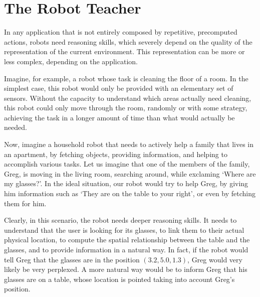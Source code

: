 \part{The Robot Teacher} %

\label{part:robot_teacher} %



In any application that is not entirely composed by repetitive, precomputed actions, robots need reasoning skills, which severely depend on the quality of the representation of the current environment. This representation can be more or less complex, depending on the application. 

Imagine, for example, a robot whose task is cleaning the floor of a room. In the simplest case, this robot would only be provided with an elementary set of sensors. Without the capacity to understand which areas actually need cleaning, this robot could only move through the room, randomly or with some strategy, achieving the task in a longer amount of time than what would actually be needed. 


Now, imagine a household robot that needs to actively help a family that lives in an apartment, by fetching objects, providing information, and helping to accomplish various tasks. Let us imagine that one of the members of the family, Greg, is moving in the living room, searching around, while exclaming `Where are my glasses?'. In the ideal situation, our robot would try to help Greg, by giving him information such as `They are on the table to your right', or even by fetching them for him. 

Clearly, in this scenario, the robot needs deeper reasoning skills. It needs to understand that the user is looking for its glasses, to link them to their actual physical location, to compute the spatial relationship between the table and the glasses, and to provide information in a natural way. In fact, if the robot would tell Greg that the glasses are in the position $(3.2, 5.0 , 1.3)$, Greg would very likely be very perplexed. A more natural way would be to inform Greg that his glasses are on a table, whose location is pointed taking into account Greg's position.

